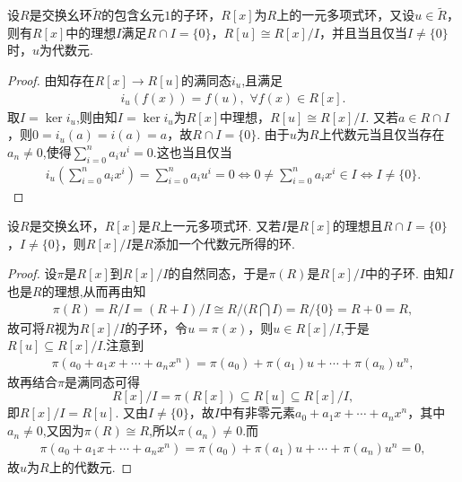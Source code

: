 \documentclass[../../main.tex]{subfiles}%
\begin{document}
\begin{corollary}\label{corollary:抽象代数--推论2.2.2}
设$R$是交换幺环$\widetilde{R}$的包含幺元$1$的子环，$R[x]$为$R$上的一元多项式环，又设$u\in\widetilde{R}$，则有$R[x]$中的理想$I$满足$R\cap I=\{0\}$，$R[u]\cong R[x]/I$，并且当且仅当$I\neq\{0\}$时，$u$为代数元.
\end{corollary}
\begin{proof}

由知存在$R[x]\to R[u]$的满同态$i_u$,且满足
\begin{align*}
i_u(f(x)) = f(u),\,\,\forall f(x)\in R[x].
\end{align*}
取$I=\ker i_u$,则由知$I=\ker i_u$为$R[x]$中理想，$R[u]\cong R[x]/I$. 又若$a\in R\cap I$，则$0=i_u(a)=i(a)=a$，故$R\cap I=\{0\}$. 由于$u$为$R$上代数元当且仅当存在$a_n\ne 0$,使得$\sum\limits_{i=0}^n a_iu^i=0$.这也当且仅当
\begin{align*}
i_u\left(\sum\limits_{i=0}^n a_ix^i\right)=\sum\limits_{i=0}^n a_iu^i=0 \iff 0\ne \sum\limits_{i=0}^n a_ix^i\in I \iff I\neq\{0\}.
\end{align*}

\end{proof}

\begin{corollary}\label{corollary:抽象代数--推论2.2.3}
设$R$是交换幺环，$R[x]$是$R$上一元多项式环. 又若$I$是$R[x]$的理想且$R\cap I=\{0\}$，$I\neq\{0\}$，则$R[x]/I$是$R$添加一个代数元所得的环.
\end{corollary}
\begin{proof}

设$\pi$是$R[x]$到$R[x]/I$的自然同态，于是$\pi(R)$是$R[x]/I$中的子环. 由知$I$也是$R$的理想,从而再由知
\begin{align*}
\pi (R)=R/I=\left( R+I \right) /I\cong R/(R\bigcap{I)}=R/\{0\}=R+0=R,
\end{align*}
故可将$R$视为$R[x]/I$的子环，令$u=\pi(x)$，则$u\in R[x]/I$,于是$R[u]\subseteq R[x]/I$.注意到
\begin{align*}
\pi(a_0+a_1x+\cdots+a_nx^n)=\pi(a_0)+\pi(a_1)u+\cdots+\pi(a_n)u^n,
\end{align*}
故再结合$\pi$是满同态可得
$$
R[x]/I=\pi(R[x])\subseteq R[u]\subseteq R[x]/I,
$$
即$R[x]/I=R[u]$. 又由$I\neq\{0\}$，故$I$中有非零元素$a_0+a_1x+\cdots+a_nx^n$，其中$a_n\ne 0$,又因为$\pi(R)\cong R$,所以$\pi(a_n)\ne 0$.而
\begin{align*}
\pi (a_0+a_1x+\cdots +a_nx^n)=\pi \left( a_0 \right) +\pi \left( a_1 \right) u+\cdots +\pi \left( a_n \right) u^n=0,
\end{align*}
故$u$为$R$上的代数元.

\end{proof}
\end{document}
